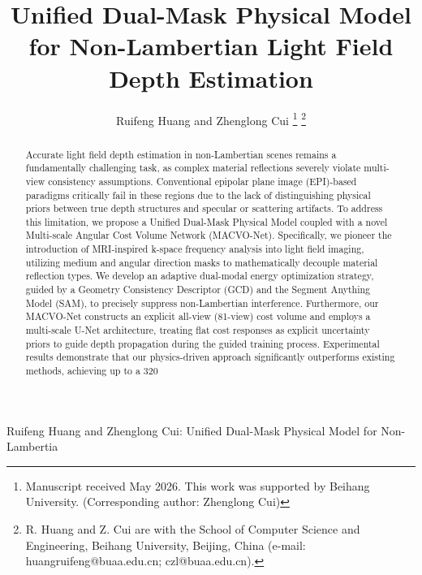 \documentclass[lettersize,journal]{IEEEtran}
\begin{document}
\title{Unified Dual-Mask Physical Model for Non-Lambertian Light Field Depth Estimation}

\author{Ruifeng Huang and Zhenglong Cui
\thanks{Manuscript received May 2026. This work was supported by Beihang University. (Corresponding author: Zhenglong Cui)}
\thanks{R. Huang and Z. Cui are with the School of Computer Science and Engineering, Beihang University, Beijing, China (e-mail: huangruifeng@buaa.edu.cn; czl@buaa.edu.cn).}}

%
{Ruifeng Huang and Zhenglong Cui: Unified Dual-Mask Physical Model for Non-Lambertia}

\maketitle

\begin{abstract}
Accurate light field depth estimation in non-Lambertian scenes remains a fundamentally challenging task, as complex material reflections severely violate multi-view consistency assumptions. Conventional epipolar plane image (EPI)-based paradigms critically fail in these regions due to the lack of distinguishing physical priors between true depth structures and specular or scattering artifacts. To address this limitation, we propose a Unified Dual-Mask Physical Model coupled with a novel Multi-scale Angular Cost Volume Network (MACVO-Net). Specifically, we pioneer the introduction of MRI-inspired k-space frequency analysis into light field imaging, utilizing medium and angular direction masks to mathematically decouple material reflection types. We develop an adaptive dual-modal energy optimization strategy, guided by a Geometry Consistency Descriptor (GCD) and the Segment Anything Model (SAM), to precisely suppress non-Lambertian interference. Furthermore, our MACVO-Net constructs an explicit all-view (81-view) cost volume and employs a multi-scale U-Net architecture, treating flat cost responses as explicit uncertainty priors to guide depth propagation during the guided training process. Experimental results demonstrate that our physics-driven approach significantly outperforms existing methods, achieving up to a 320%
\end{abstract}
\end{document}

